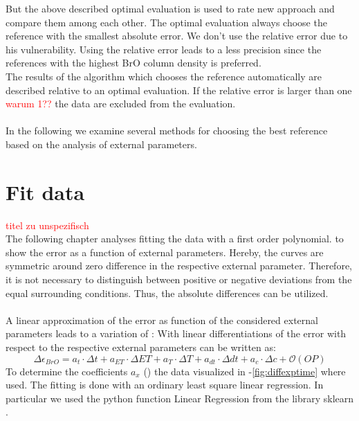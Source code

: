 \documentclass  [
  paper    = a4,
  BCOR     = 10mm,
  twoside,
  fontsize = 12pt,
  fleqn,
  toc      = bibnumbered,
  toc      = listofnumbered,
  numbers  = noendperiod,
  headings = normal,
  listof   = leveldown,
  version  = 3.03
]                                       {scrreprt}
\begin{document}
	But the above described optimal evaluation is used to rate new approach and compare them among each other. The optimal evaluation always choose the reference with the smallest absolute error. We don't use the relative error due to his vulnerability. Using the relative error leads to a less precision since the references with the highest BrO column density is preferred.\\
	The results of the algorithm which chooses the reference automatically are described relative to an optimal evaluation. If the relative error is larger than one \textcolor{red}{warum 1??} the data are excluded from the evaluation.\\
	\\
	In the following we examine several methods for choosing the best reference based on the analysis of external parameters. 
	
	\section{Fit data}
	\textcolor{red}{titel zu unspezifisch} \\
	The following chapter analyses fitting the data with a first order polynomial.  to  show the   error as a function of external parameters. Hereby, the curves are symmetric around zero difference in the respective external parameter. Therefore, it is not necessary to distinguish between positive or negative deviations from the equal surrounding conditions. Thus, the absolute differences can be utilized.\\
	\\
	A linear approximation of the   error as function of the considered external parameters leads to a variation of   :
	With linear differentiations of the   error with respect to the respective external parameters  can be written as:	
	\begin{equation}
		\Delta \epsilon_{BrO} = a_{t}\cdot\Delta t+a_{ET}\cdot\Delta ET+a_{T}\cdot\Delta T+a_{dt}\cdot\Delta dt +a_{c}\cdot\Delta c + \mathcal{O}\left(OP\right)
		\label{calc:delterr}
	\end{equation}
	To determine the coefficients $a_{x}$ () the data visualized in -\ref{fig:diffexptime} where used.  The fitting is done with an ordinary least square linear regression. In particular we used the python function Linear Regression from the library sklearn \citep{SKlearn}. \\
	
\end{document}
